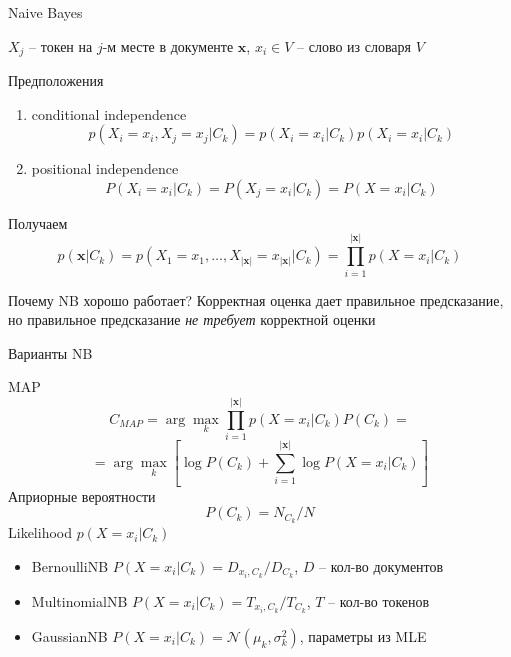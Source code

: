\documentclass[10pt,a4paper]{beamer}
\begin{document}

\begin{frame}{Naive Bayes}

$X_j$ -- токен на $j$-м месте в документе $\mathbf{x}$,
$x_i \in V$ -- слово из словаря $V$

\vspace{1em}
Предположения
\begin{enumerate}
\item conditional independence 
\[
p(X_i=x_i, X_j=x_j | C_k) = p(X_i=x_i | C_k) p(X_i=x_i | C_k)
\]
\item positional independence
\[
P(X_i=x_i | C_k) = P(X_j=x_i | C_k) = P(X = x_i | C_k)
\]
\end{enumerate}

Получаем
\[
p(\mathbf{x} | C_k) = p(X_1=x_1, \ldots, X_{|\mathbf{x}|}=x_{|\mathbf{x}|} | C_k) = \prod_{i=1}^{|\mathbf{x}|} p(X = x_i | C_k)
\]

\begin{block}{Почему NB хорошо работает?}
Корректная оценка дает правильное предсказание, но правильное предсказание {\it не требует} корректной оценки
\end{block}

\end{frame}


\begin{frame}{Варианты NB}

MAP
\[
C_{MAP} = \arg \max_k \prod_{i=1}^{|\mathbf{x}|} p(X = x_i | C_k) P(C_k) = 
\]
\[
= \arg \max_k \left[ \log P(C_k) + \sum_{i=1}^{|\mathbf{x}|} \log P(X = x_i | C_k) \right]
\]
Априорные вероятности
\[
P(C_k) = N_{C_k}/{N}
\]
Likelihood $p(X = x_i | C_k)$
\begin{itemize}
\item BernoulliNB $P(X = x_i | C_k) = D_{x_i, C_k} / D_{C_k}$, $D$ -- кол-во документов
\item MultinomialNB $P(X = x_i | C_k) = T_{x_i, C_k} / T_{C_k}$, $T$ -- кол-во токенов
\item GaussianNB $P(X = x_i | C_k) = \mathcal{N}(\mu_k, \sigma_k^2)$, параметры из MLE
\end{itemize}

\end{frame}

\end{document}
